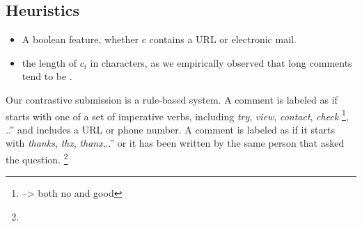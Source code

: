 \subsection{Heuristics}
\label{ssub:heuristics}


\begin{itemize}
 \item A boolean feature, whether $c$ contains a URL or electronic mail. 
 \item the length of $c_i$ in characters, as we empirically observed that long 
  comments tend to be \good.
\end{itemize}


Our contrastive submission  is a rule-based system. A comment is 
labeled as \good if starts with one of a set of imperative verbs, including 
\textit{try}, \textit{view}, \textit{contact}, \textit{check}%
\footnote{
 --> both no and good


% 
% 


}, ..” and includes a URL or phone number. A comment is labeled 
as \dial if it starts with \textit{thanks}, \textit{thx}, \textit{thanx},..” 
or it has been written by the same person that asked the question.%
\footnote{}



